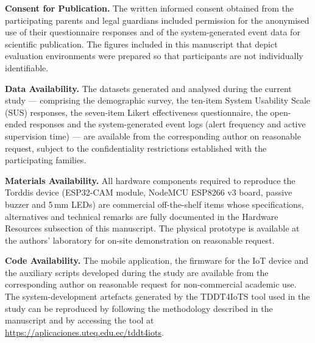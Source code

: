 \documentclass[pdflatex,sn-apa]{sn-jnl}%
\begin{document}
    \textbf{Consent for Publication.}
        The written informed consent obtained from the participating parents and legal guardians included permission for the anonymised use of their questionnaire responses and of the system-generated event data for scientific publication. The figures included in this manuscript that depict evaluation environments were prepared so that participants are not individually identifiable.

    \textbf{Data Availability.}
        The datasets generated and analysed during the current study --- comprising the demographic survey, the ten-item System Usability Scale (SUS) responses, the seven-item Likert effectiveness questionnaire, the open-ended responses and the system-generated event logs (alert frequency and active supervision time) --- are available from the corresponding author on reasonable request, subject to the confidentiality restrictions established with the participating families.

    \textbf{Materials Availability.}
        All hardware components required to reproduce the Torddis device (ESP32-CAM module, NodeMCU ESP8266 v3 board, passive buzzer and 5\,mm LEDs) are commercial off-the-shelf items whose specifications, alternatives and technical remarks are fully documented in the Hardware Resources subsection of this manuscript. The physical prototype is available at the authors' laboratory for on-site demonstration on reasonable request.

    \textbf{Code Availability.}
        The mobile application, the firmware for the IoT device and the auxiliary scripts developed during the study are available from the corresponding author on reasonable request for non-commercial academic use. The system-development artefacts generated by the TDDT4IoTS tool used in the study can be reproduced by following the methodology described in the manuscript and by accessing the tool at \url{https://aplicaciones.uteq.edu.ec/tddt4iots}.
\end{document}
